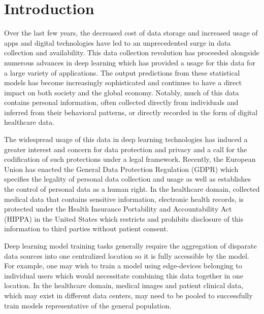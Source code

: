 \documentclass[twocolumn, switch]{article} %
\begin{document}

\section{Introduction}

Over the last few years, the decreased cost of data storage and increased usage of apps and digital technologies have led to an unprecedented surge in data collection and availability. This data collection revolution has proceeded alongside numerous advances in deep learning which has provided a usage for this data for a large variety of applications. The output predictions from these statistical models has become increasingly sophisticated and continues to have a direct impact on both society and the global economy. Notably, much of this data contains personal information, often collected directly from individuals and inferred from their behavioral patterns, or directly recorded in the form of digital healthcare data.

The widespread usage of this data in deep learning technologies has induced a greater interest and concern for data protection and privacy and a call for the codification of such protections under a legal framework. Recently, the European Union has enacted the General Data Protection Regulation (GDPR) \cite{gdpr, gpdr_url} which specifies the legality of personal data collection and usage as well as establishes the control of personal data as a human right. In the healthcare domain, collected medical data that contains sensitive information, electronic health records, is protected under the Health Insurance Portability and Accountability Act (HIPPA) in the United States which restricts and prohibits disclosure of this information to third parties without patient consent. 

Deep learning model training tasks generally require the aggregation of disparate data sources into one centralized location so it is fully accessible by the model. For example, one may wish to train a model using edge-devices belonging to individual users which would necessitate combining this data together in one location. In the healthcare domain, medical images and patient clinical data, which may exist in different data centers, may need to be pooled to successfully train models representative of the general population. 
\end{document}
